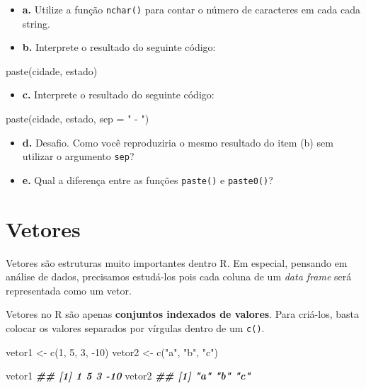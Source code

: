 \documentclass[
]{book}
\newenvironment{Shaded}{\begin{snugshade}}{\end{snugshade}}
\newcommand{\AttributeTok}[1]{\textcolor[rgb]{0.77,0.63,0.00}{#1}}
\newcommand{\DecValTok}[1]{\textcolor[rgb]{0.00,0.00,0.81}{#1}}
\newcommand{\DocumentationTok}[1]{\textcolor[rgb]{0.56,0.35,0.01}{\textbf{\textit{#1}}}}
\newcommand{\FunctionTok}[1]{\textcolor[rgb]{0.00,0.00,0.00}{#1}}
\newcommand{\NormalTok}[1]{#1}
\newcommand{\OtherTok}[1]{\textcolor[rgb]{0.56,0.35,0.01}{#1}}
\newcommand{\SpecialCharTok}[1]{\textcolor[rgb]{0.00,0.00,0.00}{#1}}
\newcommand{\StringTok}[1]{\textcolor[rgb]{0.31,0.60,0.02}{#1}}
\providecommand{\tightlist}{%
  \setlength{\itemsep}{0pt}\setlength{\parskip}{0pt}}
\begin{document}
\begin{itemize}
\item
  \textbf{a.} Utilize a função \texttt{nchar()} para contar o número de caracteres em cada cada string.
\item
  \textbf{b.} Interprete o resultado do seguinte código:
\end{itemize}

\begin{Shaded}
\begin{Highlighting}[]
\FunctionTok{paste}\NormalTok{(cidade, estado)}
\end{Highlighting}
\end{Shaded}

\begin{itemize}
\tightlist
\item
  \textbf{c.} Interprete o resultado do seguinte código:
\end{itemize}

\begin{Shaded}
\begin{Highlighting}[]
\FunctionTok{paste}\NormalTok{(cidade, estado, }\AttributeTok{sep =} \StringTok{" {-} "}\NormalTok{)}
\end{Highlighting}
\end{Shaded}

\begin{itemize}
\item
  \textbf{d.} Desafio. Como você reproduziria o mesmo resultado do item (b) sem utilizar o argumento \texttt{sep}?
\item
  \textbf{e.} Qual a diferença entre as funções \texttt{paste()} e \texttt{paste0()}?
\end{itemize}

\hypertarget{vetores}{%
\section{Vetores}\label{vetores}}

Vetores são estruturas muito importantes dentro R. Em especial, pensando em análise de dados, precisamos estudá-los pois cada coluna de um \emph{data frame} será representada como um vetor.

Vetores no R são apenas \textbf{conjuntos indexados de valores}. Para criá-los, basta colocar os valores separados por vírgulas dentro de um \texttt{c()}.

\begin{Shaded}
\begin{Highlighting}[]
\NormalTok{vetor1 }\OtherTok{\textless{}{-}} \FunctionTok{c}\NormalTok{(}\DecValTok{1}\NormalTok{, }\DecValTok{5}\NormalTok{, }\DecValTok{3}\NormalTok{, }\SpecialCharTok{{-}}\DecValTok{10}\NormalTok{)}
\NormalTok{vetor2 }\OtherTok{\textless{}{-}} \FunctionTok{c}\NormalTok{(}\StringTok{"a"}\NormalTok{, }\StringTok{"b"}\NormalTok{, }\StringTok{"c"}\NormalTok{)}

\NormalTok{vetor1}
\DocumentationTok{\#\# [1]   1   5   3 {-}10}
\NormalTok{vetor2}
\DocumentationTok{\#\# [1] "a" "b" "c"}
\end{Highlighting}
\end{Shaded}
\end{document}
